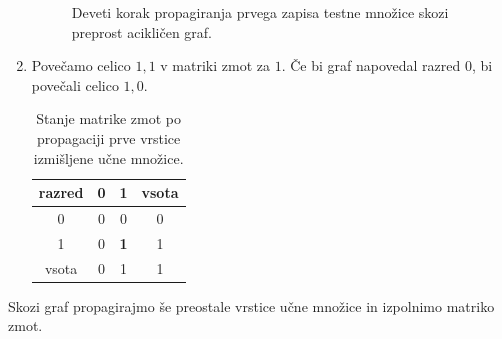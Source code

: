 \documentclass[a4paper,12pt,openright]{book}
\begin{document}
\begin{enumerate}
\begin{figure}[H]
            \caption{Deveti korak propagiranja prvega zapisa testne množice skozi preprost acikličen graf.}
            \label{fig:izracun_kakovosti_primer_9}
        \end{figure}
        \item Povečamo celico $1,1$ v matriki zmot za $1$.
        Če bi graf napovedal razred 0, bi povečali celico $1,0$.
        \begin{table}[H]
            \centering
            \begin{tabular}{||c c c c||}
                \hline
                razred & 0 & 1          & vsota \\ [0.5ex]
                \hline
                0      & 0 & 0          & 0     \\
                \hline
                1      & 0 & \textbf{1} & 1     \\
                \hline
                vsota  & 0 & 1          & 1     \\
                \hline
            \end{tabular}
            \caption{Stanje matrike zmot po propagaciji prve vrstice izmišljene učne množice.}
            \label{tab:izracun_kakovosti_cm_1}
        \end{table}
    \end{enumerate}

    Skozi graf propagirajmo še preostale vrstice učne množice in izpolnimo matriko zmot.
\end{document}
